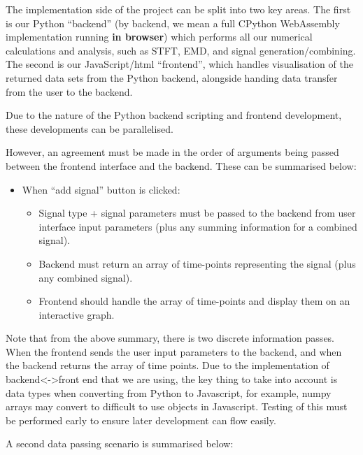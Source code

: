 \documentclass[
  paper=a4,
  ,captions=tableheading
]{scrartcl}
\providecommand{\tightlist}{%
  \setlength{\itemsep}{0pt}\setlength{\parskip}{0pt}}
\begin{document}
The implementation side of the project can be split into two key areas.
The first is our Python ``backend'' (by backend, we mean a full CPython
WebAssembly implementation running \textbf{in browser}) which performs
all our numerical calculations and analysis, such as STFT, EMD, and
signal generation/combining. The second is our JavaScript/html
``frontend'', which handles visualisation of the returned data sets from
the Python backend, alongside handing data transfer from the user to the
backend.

Due to the nature of the Python backend scripting and frontend
development, these developments can be parallelised.

However, an agreement must be made in the order of arguments being
passed between the frontend interface and the backend. These can be
summarised below:

\begin{itemize}
\tightlist
\item
  When ``add signal'' button is clicked:

  \begin{itemize}
  \tightlist
  \item
    Signal type + signal parameters must be passed to the backend from
    user interface input parameters (plus any summing information for a
    combined signal).
  \item
    Backend must return an array of time-points representing the signal
    (plus any combined signal).
  \item
    Frontend should handle the array of time-points and display them on
    an interactive graph.
  \end{itemize}
\end{itemize}

Note that from the above summary, there is two discrete information
passes. When the frontend sends the user input parameters to the
backend, and when the backend returns the array of time points. Due to
the implementation of backend\textless-\textgreater front end that we
are using, the key thing to take into account is data types when
converting from Python to Javascript, for example, numpy arrays may
convert to difficult to use objects in Javascript. Testing of this must
be performed early to ensure later development can flow easily.

A second data passing scenario is summarised below:
\end{document}

